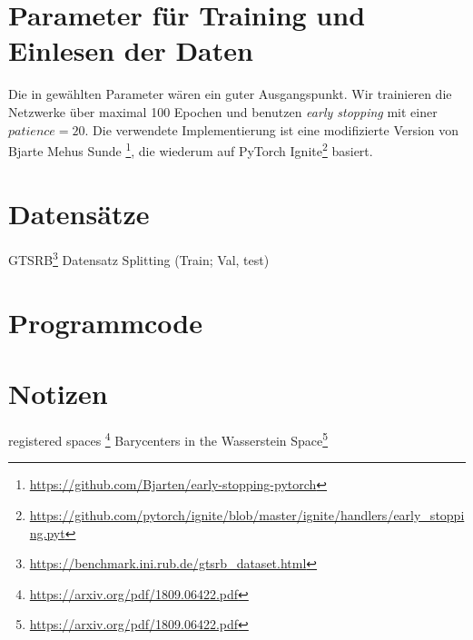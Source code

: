 \documentclass[twoside, 11pt,a4paper]{article}
\numberwithin{equation}{section}
\begin{document}
	\section{Parameter für Training und Einlesen der Daten}
	Die in \cite{CH} gewählten Parameter wären ein guter Ausgangspunkt.
	Wir trainieren die Netzwerke über maximal 100 Epochen und benutzen \textit{early stopping} mit einer $patience=20$. Die verwendete Implementierung ist eine modifizierte Version von Bjarte Mehus Sunde \footnote{\url{https://github.com/Bjarten/early-stopping-pytorch}}, die wiederum auf PyTorch Ignite\footnote{\url{https://github.com/pytorch/ignite/blob/master/ignite/handlers/early\_stopping.pyt}} basiert.
	\section{Datensätze}
	GTSRB\footnote{\url{https://benchmark.ini.rub.de/gtsrb_dataset.html}}
	Datensatz Splitting (Train; Val, test)
	\section{Programmcode}
	
	
	
	\section{Notizen}
	registered spaces \footnote{\url{https://arxiv.org/pdf/1809.06422.pdf}}
	Barycenters in the Wasserstein Space\footnote{\url{https://arxiv.org/pdf/1809.06422.pdf}}
	\newpage
	
	\printglossaries

	\newpage
	
	
	
	

	
	
\end{document}
